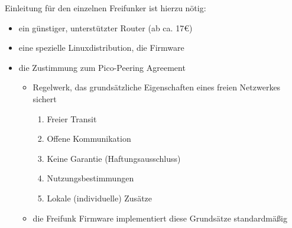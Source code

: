 \begin{frame}{Einleitung}
	für den einzelnen Freifunker ist hierzu nötig:
	\begin{itemize}
		\item<1-> ein günstiger, unterstützter Router (ab ca. 17€)
		\item<1-> eine spezielle Linuxdistribution, die Firmware
		\item<1-> die Zustimmung zum \glqq Pico-Peering Agreement\grqq
							\begin{itemize}
								\item<2-> Regelwerk, das grundsätzliche Eigenschaften eines freien Netzwerkes sichert
													\begin{enumerate}
														\item Freier Transit
														\item Offene Kommunikation
														\item Keine Garantie (Haftungsausschluss)
														\item Nutzungsbestimmungen
														\item Lokale (individuelle) Zusätze
													\end{enumerate}
							\item<2-> die Freifunk Firmware implementiert diese Grundsätze standardmäßig
							\end{itemize}
	\end{itemize}
\end{frame}
